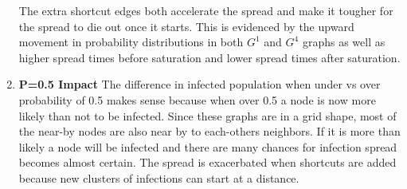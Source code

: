 \documentclass[letterpaper,9pt]{article}
\begin{document}
\begin{enumerate}
    The extra shortcut edges both accelerate the spread and make it tougher for
    the spread to die out once it starts. This is evidenced by the upward movement
    in probability distributions in both $G^{1}$ and $G^{4}$ graphs as well as 
    higher spread times before saturation and lower spread times after saturation.

\item \textbf{P=0.5 Impact}
    The difference in infected population when under vs over probability of 0.5 
    makes sense because when over 0.5 a node is now more likely than not to be
    infected. Since these graphs are in a grid shape, most of the near-by nodes
    are also near by to each-others neighbors. If it is more than likely a node 
    will be infected and there are many chances for infection spread becomes 
    almost certain. The spread is exacerbated when shortcuts are added because
    new clusters of infections can start at a distance.
\end{enumerate}
\end{document}
